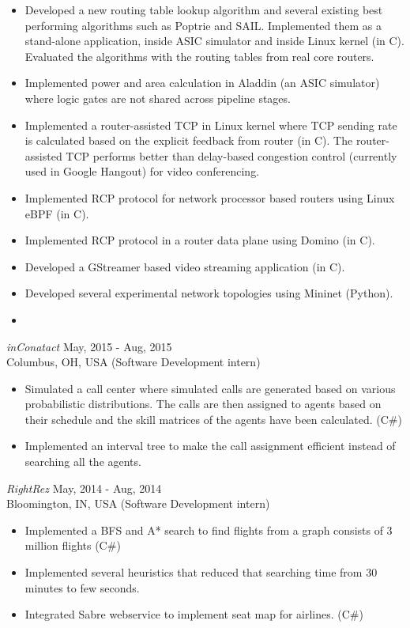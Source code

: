 \documentclass{res}
\begin{document}
\begin{resume}
   \begin{itemize} \itemsep -2pt %
  \item Developed a new routing table lookup algorithm and several existing best performing algorithms such as Poptrie and SAIL. Implemented them as a stand-alone application, inside ASIC simulator and inside Linux kernel (in C). Evaluated the algorithms with the routing tables from real core routers.
  \item Implemented power and area calculation in Aladdin (an ASIC simulator) where logic gates are not shared across pipeline stages.
  \item Implemented a router-assisted TCP in Linux kernel where TCP sending rate is calculated based on the explicit feedback from router (in C). The router-assisted TCP performs better than delay-based congestion control (currently used in Google Hangout) for video conferencing.  
  \item Implemented RCP protocol for network processor based routers using Linux eBPF (in C). 
  \item Implemented RCP protocol in a router data plane using Domino (in C).
  \item Developed a GStreamer based video streaming application (in C).
  \item Developed several experimental network topologies using Mininet (Python).
  \item     	
 \end{itemize}

{\sl inConatact}       \hfill               May, 2015 - Aug, 2015 \\
Columbus, OH, USA \hfill   (Software Development intern)
 \begin{itemize} \itemsep -2pt
	\item  Simulated a call center where simulated calls are generated based on various probabilistic distributions. The calls are then assigned to
	agents based on their schedule and the skill matrices of the agents have been calculated. (C\#)
	\item  Implemented an interval tree to make the call assignment efficient instead of searching all the agents.
  \end{itemize} \vspace{-6pt}

{\sl RightRez}       \hfill               May, 2014 - Aug, 2014 \\
Bloomington, IN, USA \hfill   (Software Development intern)
\begin{itemize} \itemsep -2pt
	\item  Implemented a BFS and A* search to find flights from a graph consists of 3 million flights (C\#)
	\item  Implemented several heuristics that reduced that searching time from 30 minutes to few seconds.
    \item  Integrated Sabre webservice to implement seat map for airlines. (C\#)
\end{itemize} \vspace{-6pt}


\end{resume}
\end{document}
